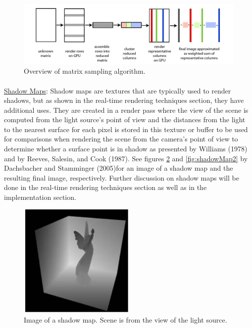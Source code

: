\begin{figure}[h!]
  \centering
    \includegraphics[width=1.0\textwidth]{matrixSampling.jpg}
  \caption{Overview of matrix sampling algorithm.}
	\label{fig:matrixSampling}
\end{figure}

\paragraph{}
\underline{Shadow Maps}: Shadow maps are textures that are typically used to render shadows, but as shown in the real-time rendering techniques section, they have additional uses.  They are created in a render pass where the view of the scene is computed from the light source's point of view and the distances from the light to the nearest surface for each pixel is stored in this texture or buffer to be used for comparisons when rendering the scene from the camera's point of view to determine whether a surface point is in shadow as presented by Williams (1978) and by Reeves, Salesin, and Cook (1987).  See figures \ref{fig:shadowMap1} and \ref{fig:shadowMap2} by Dachsbacher and Stamminger (2005)for an image of a shadow map and the resulting final image, respectively.  Further discussion on shadow maps will be done in the real-time rendering techniques section as well as in the implementation section.
\begin{figure}[h!]
  \centering
    \includegraphics[width=0.5\textwidth]{shadowMap1.jpg}
  \caption{Image of a shadow map. Scene is from the view of the light source.}
	\label{fig:shadowMap1}
\end{figure}
